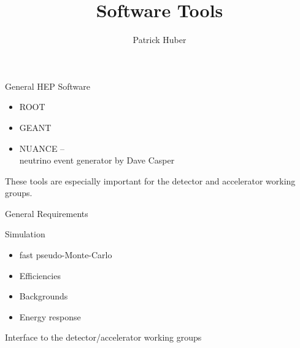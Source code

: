 \documentclass[pdf,ps2pdf,azure,slideColor,colorBG]{prosper}
\title{Software Tools}
\author{Patrick Huber}
\begin{document}
\maketitle


\begin{slide}{General HEP Software}
\begin{itemize}
\item ROOT
\item GEANT
\item NUANCE --\\
 neutrino event generator by Dave Casper
\end{itemize}

These tools are especially important for the detector and accelerator
working groups.\\

\end{slide}



\begin{slide}{General Requirements}

Simulation
\begin{itemize}
\item fast pseudo-Monte-Carlo 
\item Efficiencies
\item Backgrounds
\item Energy response 
\end{itemize}
Interface to the detector/accelerator working groups
\end{slide}
\end{document}
